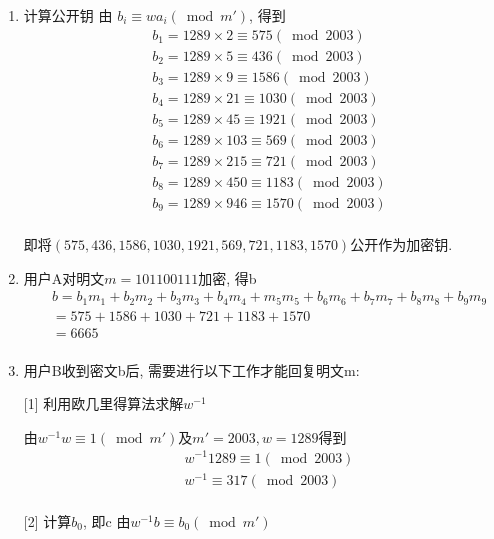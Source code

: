\documentclass[UTF8]{ctexart}
\begin{document}
    \begin{enumerate}
        \item 计算公开钥
        由 $b_i\equiv wa_i(\bmod m')$, 得到
        $$
        \begin{aligned}
            &b_1=1289\times 2\equiv 575(\bmod 2003)\\
            &b_2=1289\times 5\equiv 436(\bmod 2003)\\
            &b_3=1289\times 9\equiv 1586(\bmod 2003)\\
            &b_4=1289\times 21\equiv 1030(\bmod 2003)\\
            &b_5=1289\times 45\equiv 1921(\bmod 2003)\\
            &b_6=1289\times 103\equiv 569(\bmod 2003)\\
            &b_7=1289\times 215\equiv 721(\bmod 2003)\\
            &b_8=1289\times 450\equiv 1183(\bmod 2003)\\
            &b_9=1289\times 946\equiv 1570(\bmod 2003)\\
        \end{aligned}
        $$

        即将$(575, 436, 1586, 1030, 1921, 569, 721, 1183, 1570)$公开作为加密钥.

        \item 用户A对明文$m=101100111$加密, 得b
        $$
        \begin{aligned}
            &b=b_1m_1+b_2m_2+b_3m_3+b_4m_4+m_5m_5+b_6m_6+b_7m_7+b_8m_8+b_9m_9\\
             &=575+1586+1030+721+1183+1570\\
             &=6665\\
        \end{aligned}
        $$

        \item 用户B收到密文b后, 需要进行以下工作才能回复明文m:

        [1] 利用欧几里得算法求解$w^{-1}$

        由$w^{-1}w\equiv 1(\bmod m')$及$m'=2003, w=1289$得到
        $$
        \begin{aligned}
            &w^{-1}1289\equiv 1(\bmod 2003)\\
            &w^{-1}\equiv 317(\bmod 2003)\\
        \end{aligned}
        $$

        [2] 计算$b_0$, 即c
        由$w^{-1}b\equiv b_0(\bmod m')$


\end{enumerate}
\end{document}
